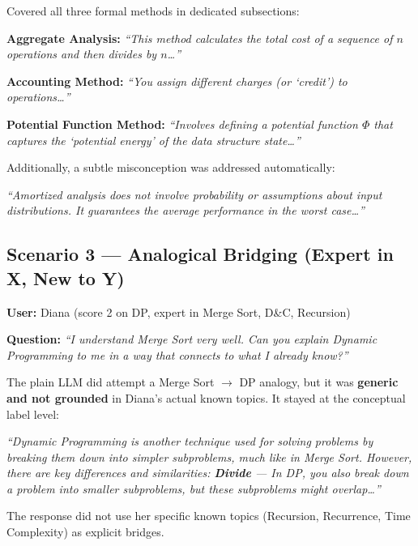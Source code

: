 \documentclass[12pt,a4paper]{article}
\newenvironment{ragbox}[1]{%
  \begin{tcolorbox}[
    title={\textbf{#1}},
    colback=ragbg,
    colframe=ragborder,
    colbacktitle=ragborder,
    coltitle=white,
    left=6pt, right=6pt, top=4pt, bottom=4pt,
    boxrule=0.5pt,
    arc=3pt,
    fonttitle=\small\bfseries,
    breakable,
  ]
  \small
}{%
  \end{tcolorbox}
}
\newenvironment{plainbox}[1]{%
  \begin{tcolorbox}[
    title={\textbf{#1}},
    colback=plainbg,
    colframe=plainborder,
    colbacktitle=plainborder,
    coltitle=white,
    left=6pt, right=6pt, top=4pt, bottom=4pt,
    boxrule=0.5pt,
    arc=3pt,
    fonttitle=\small\bfseries,
    breakable,
  ]
  \small
}{%
  \end{tcolorbox}
}
\begin{document}
\begin{ragbox}{WITH RAG --- Charlie}
Covered all three formal methods in dedicated subsections:

\medskip
\textbf{Aggregate Analysis:} \textit{``This method calculates the total cost of
a sequence of $n$ operations and then divides by $n$\ldots''}

\textbf{Accounting Method:} \textit{``You assign different charges (or `credit')
to operations\ldots''}

\textbf{Potential Function Method:} \textit{``Involves defining a potential
function $\Phi$ that captures the `potential energy' of the data structure
state\ldots''}

\medskip
Additionally, a subtle misconception was addressed automatically:

\medskip
\textit{``Amortized analysis does not involve probability or assumptions about
input distributions. It guarantees the average performance in the worst case\ldots''}
\end{ragbox}

\subsection{Scenario 3 --- Analogical Bridging (Expert in X, New to Y)}

\textbf{User:} Diana (score 2 on DP, expert in Merge Sort, D\&C, Recursion)

\textbf{Question:} \textit{``I understand Merge Sort very well. Can you explain
Dynamic Programming to me in a way that connects to what I already know?''}

\begin{plainbox}{WITHOUT RAG --- Diana}
The plain LLM did attempt a Merge Sort $\to$ DP analogy, but it was
\textbf{generic and not grounded} in Diana's actual known topics. It stayed at
the conceptual label level:

\medskip
\textit{``Dynamic Programming is another technique used for solving problems by
breaking them down into simpler subproblems, much like in Merge Sort. However,
there are key differences and similarities: \textbf{Divide} --- In DP, you also
break down a problem into smaller subproblems, but these subproblems might
overlap\ldots''}

\medskip
The response did not use her specific known topics (Recursion, Recurrence, Time
Complexity) as explicit bridges.
\end{plainbox}
\end{document}
